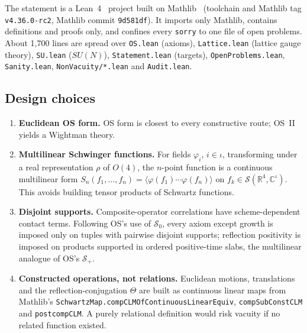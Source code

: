 \documentclass[11pt]{article}
\theoremstyle{definition}
\theoremstyle{remark}
\newcommand{\R}{\mathbb{R}}
\newcommand{\C}{\mathbb{C}}
\newcommand{\Sch}{\mathcal{S}}
\newcommand{\lean}[1]{\texttt{\hyphenchar\font=-1\relax #1}}
\newcommand{\dotbr}{.\allowbreak}
\begin{document}
The statement is a Lean~4~\cite{Moura2021} project built on Mathlib~\cite{Mathlib2020}
(toolchain and Mathlib tag \lean{v4.36.0-rc2}, Mathlib commit \lean{9d581df}). It imports only
Mathlib, contains definitions and proofs only, and confines every \lean{sorry} to one file of
open problems. About 1{,}700 lines are spread over \lean{OS.lean} (axioms),
\lean{Lattice.lean} (lattice gauge theory), \lean{SU.lean} ($SU(N)$),
\lean{Statement.lean} (targets), \lean{OpenProblems.lean}, \lean{Sanity.lean},
\lean{NonVacuity/*.lean} and \lean{Audit.lean}.

\subsection{Design choices}
\begin{enumerate}[leftmargin=*]
\item \textbf{Euclidean OS form.} OS form is closest to every constructive route; OS~II yields a
  Wightman theory.
\item \textbf{Multilinear Schwinger functions.} For fields $\varphi_i$, $i\in\iota$, transforming
  under a real representation $\rho$ of $O(4)$, the $n$-point function is a continuous
  multilinear form
  $S_n(f_1,\dots,f_n)=\langle\varphi(f_1)\cdots\varphi(f_n)\rangle$ on
  $f_k\in\Sch(\R^4,\C^\iota)$. This avoids building tensor products of Schwartz functions.
\item \textbf{Disjoint supports.} Composite-operator correlations have scheme-dependent contact
  terms. Following OS's use of $\Sch_0$, every axiom except growth is imposed only on tuples
  with pairwise disjoint supports; reflection positivity is imposed on products supported in
  ordered positive-time slabs, the multilinear analogue of OS's $\Sch_+$.
\item \textbf{Constructed operations, not relations.} Euclidean motions, translations and the
  reflection-conjugation $\Theta$ are built as continuous linear maps from Mathlib's
  \lean{SchwartzMap\dotbr compCLMOfContinuousLinearEquiv}, \lean{compSubConstCLM} and
  \lean{postcompCLM}. A purely relational definition would risk vacuity if no related function
  existed.
\end{enumerate}
\end{document}

